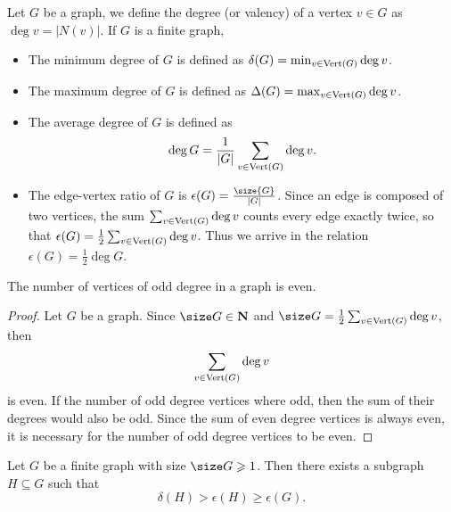 \begin{definition}[Degree]\label{def: degree}
    Let \(G\) be a graph, we define the degree (or valency) of a vertex \(v \in
    G\) as \(\deg v = |N(v)|\). If \(G\) is a finite graph,
    \begin{itemize}
        \setlength\itemsep{0em}
        \item The minimum degree of \(G\) is defined as \(\delta(G) = \min_{v \in
                  \operatorname{Vert}(G)} \deg v\).
        \item The maximum degree of \(G\) is defined as \(\Delta(G) = \max_{v \in
                  \operatorname{Vert}(G)} \deg v\).
        \item The average degree of \(G\) is defined as
              \[
                  \deg G = \frac 1 {|G|} \sum_{v \in \operatorname{Vert}(G)} \deg v.
              \]
        \item The edge-vertex ratio of \(G\) is \(\epsilon(G) =
              \frac{\size{G}}{|G|}\). Since an edge is composed of two vertices, the sum
              \(\sum_{v \in \operatorname{Vert}(G)} \deg v\) counts every edge exactly twice, so that
              \(\epsilon(G) = \frac 1 2 \sum_{v \in \operatorname{Vert}(G)} \deg v\). Thus we arrive in
              the relation \(\epsilon(G) = \frac 1 2 \deg G\).
    \end{itemize}
\end{definition}

\begin{lemma}\label{lem: handshaking}
    The number of vertices of odd degree in a graph is even.
\end{lemma}

\begin{proof}
    Let \(G\) be a graph. Since \(\size G \in \N\) and \(\size G = \frac 1 2
    \sum_{v \in \Vertex(G)} \deg v\), then
    \[
        \sum_{v \in \operatorname{Vert}(G)} \deg v
    \]
    is even. If the number of odd degree vertices where odd, then the sum of their
    degrees would also be odd. Since the sum of even degree vertices is always
    even, it is necessary for the number of odd degree vertices to be even.
\end{proof}

\begin{proposition}\label{prop: edge-dense-subgraph}
    Let \(G\) be a finite graph with size \(\size G \geq 1\). Then there exists a
    subgraph \(H \subseteq G\) such that
    \[
        \delta(H) > \epsilon(H) \geq \epsilon(G).
    \]
\end{proposition}

